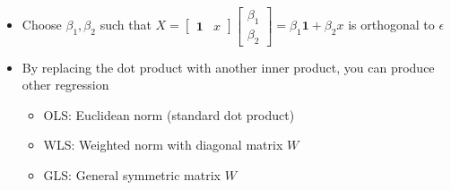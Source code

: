 \documentclass{article}
\begin{document}
\begin{itemize}
\begin{itemize}
\begin{itemize}
            \item Choose $\beta_1, \beta_2$ such that $X = \left[ \begin{array}{cc}
                \bm{1} & x            \end{array}\right]
            \left[ \begin{array}{c}
                \beta_1 \\ \beta_2
            \end{array}\right] = \beta_1 \bm{1} + \beta_2 x$ is orthogonal to $\epsilon$
            \item By replacing the dot product with another inner product, you can produce other regression
            \begin{itemize}
                \item OLS: Euclidean norm (standard dot product)
                \item WLS: Weighted norm with diagonal matrix $W$
                \item GLS: General symmetric matrix $W$
            \end{itemize}
        \end{itemize}
    \end{itemize}
\end{itemize}
\end{document}
